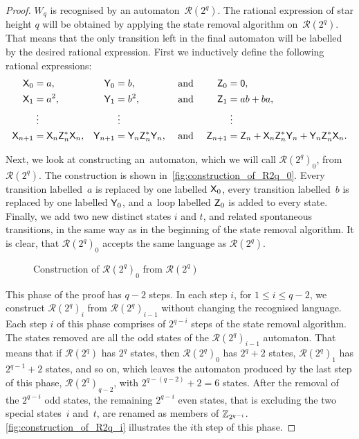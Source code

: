 \begin{proof}
    $W_q$ is recognised by an automaton~${\mathcal{R}(2^q)}$. The rational expression of star height $q$ will be obtained by applying the state removal algorithm on~${\mathcal{R}(2^q)}$. That means that the only transition left in the final automaton will be labelled by the desired rational expression. First we inductively define the following rational expressions:
    \begin{align*}
        {\mathsf{X}}_0 &= a, & {\mathsf{Y}}_0 &= b, & &\text{ and } & {\mathsf{Z}}_0 &= {\mathsf{0}}, \\
        {\mathsf{X}}_1 &= a^2, & {\mathsf{Y}}_1 &= b^2, & &\text{ and } & {\mathsf{Z}}_1 &= ab+ba, \\
        &\; \vdots & &\; \vdots & & & &\; \vdots \\
        {\mathsf{X}}_{n+1} &= {\mathsf{X}}_n {\mathsf{Z}}_n^* {\mathsf{X}}_n, & {\mathsf{Y}}_{n+1} &= {\mathsf{Y}}_n {\mathsf{Z}}_n^* {\mathsf{Y}}_n, & &\text{ and } & {\mathsf{Z}}_{n+1} &= {\mathsf{Z}}_n + {\mathsf{X}}_n {\mathsf{Z}}_n^* {\mathsf{Y}}_n + {\mathsf{Y}}_n {\mathsf{Z}}_n^* {\mathsf{X}}_n.
    \end{align*}

    Next, we look at constructing an~automaton, which we will call ${\mathcal{R}(2^q)}_0$, from ${\mathcal{R}(2^q)}$. The construction is shown in~\autoref*{fig:construction_of_R2q_0}. Every transition labelled~$a$ is replaced by one labelled ${\mathsf{X}}_0$, every transition labelled~$b$ is replaced by one labelled ${\mathsf{Y}}_0$, and a~loop labelled ${\mathsf{Z}}_0$ is added to every state. Finally, we add two new distinct states $i$ and $t$, and related spontaneous transitions, in the same way as in the beginning of the state removal algorithm. It is clear, that ${\mathcal{R}(2^q)}_0$ accepts the same language as ${\mathcal{R}(2^q)}$.

    \begin{figure}[h]%
        \centering
        \hspace{60pt}%
        \caption{Construction of ${\mathcal{R}(2^q)}_0$ from ${\mathcal{R}(2^q)}$}\label{fig:construction_of_R2q_0}%
    \end{figure}

    This phase of the proof has $q-2$ steps. In each step $i$, for $1 \leq i \leq q-2$, we construct ${\mathcal{R}(2^q)}_i$ from ${\mathcal{R}(2^q)}_{i-1}$ without changing the recognised language. Each step $i$ of this phase comprises of $2^{q-i}$ steps of the state removal algorithm. The states removed are all the odd states of the ${\mathcal{R}(2^q)}_{i-1}$ automaton. That means that if ${\mathcal{R}(2^q)}$ has $2^q$ states, then ${\mathcal{R}(2^q)}_0$ has $2^q + 2$ states, ${\mathcal{R}(2^q)}_1$ has $2^{q-1} + 2$ states, and so on, which leaves the automaton produced by the last step of this phase, ${\mathcal{R}(2^q)}_{q-2}$, with $2^{q-(q-2)} + 2 = 6$ states. After the removal of the $2^{q-i}$ odd states, the remaining $2^{q-i}$ even states, that is excluding the two special states~$i$ and~$t$, are renamed as members of $\mathbb{Z}_{2^{q-i}}$. \autoref*{fig:construction_of_R2q_i} illustrates the $i$th step of this phase.


\end{proof}
